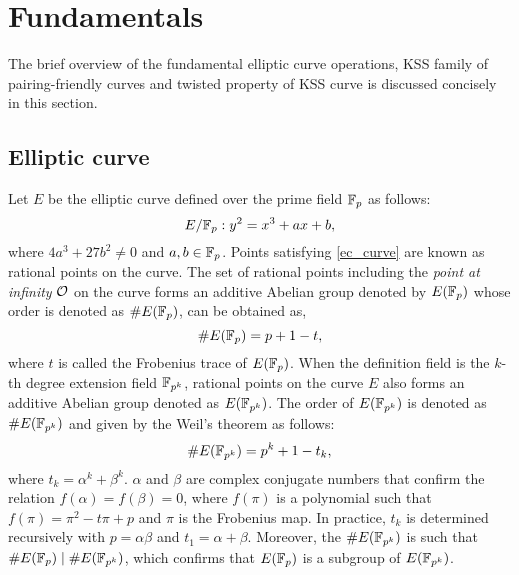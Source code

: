 \section{Fundamentals}
The brief overview of the fundamental elliptic curve operations, KSS family of pairing-friendly curves and twisted property of KSS curve is discussed concisely in this section.

\subsection{Elliptic curve \cite{ecc_book}}
Let $E$ be the elliptic curve defined over the prime field ${\mathbb{F}}_{p}$  as follows:
\begin{equation}\label{ec_curve}
E/{\mathbb{F}}_{p} : y^2=x^3+ax+b,
\end{equation}
where $ 4a^3+27b^2 \neq 0$ and $a,b \in {\mathbb{F}}_{p}$. Points satisfying \eqref{ec_curve} are known as rational points on the curve.
The set of rational points including the \textit{point at infinity} $\cal{O}$ on the curve forms an additive Abelian group denoted by $E(\mathbb{F}_p)$ whose  order is denoted as $\#E({\mathbb{F}}_{p})$, can be obtained as,
\begin{equation}\label{order}
\#E({\mathbb{F}}_{p}) = p+1-t,
\end{equation} 
where $t$ is called the Frobenius trace of $E({\mathbb{F}}_{p})$.
When the definition field is the $k$-th degree extension field $\mathbb{F}_{p^k}$, rational points on the curve $E$ also forms an additive Abelian group denoted as $E(\mathbb{F}_{p^k})$. The order of $E(\mathbb{F}_{p^k})$ is denoted as $\#E(\mathbb{F}_{p^k})$ and given by the  Weil’s theorem \cite{ate} as follows:
\begin{equation}
\#E(\mathbb{F}_{p^k}) = p^k +1- t_k,
\end{equation}
 where $t_k =  \alpha^k + \beta^k$.  $\alpha$ and $\beta$ are  complex conjugate numbers that confirm the relation $f(\alpha) = f(\beta) = 0$,  where $f(\pi)$ is a polynomial such that $f(\pi) = \pi^2 -t\pi + p$ and $\pi$ is the Frobenius map. In practice, $t_k$ is determined recursively with $p = \alpha\beta$ and $t_1 = \alpha + \beta$. Moreover, the  $\#E(\mathbb{F}_{p^k})$ is such that $\#E(\mathbb{F}_p)\mid \#E(\mathbb{F}_{p^k})$, which confirms that  $E(\mathbb{F}_p)$ is a subgroup of $E(\mathbb{F}_{p^k})$.

